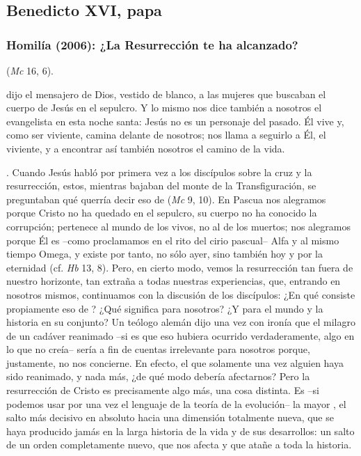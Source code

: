 \newsection
\subsection{Benedicto XVI, papa}

\subsubsection{Homilía (2006): ¿La Resurrección te ha alcanzado?}


\begin{body}
 (\textit{Mc} 16, 6). 

 dijo el mensajero de Dios, vestido de blanco, a las mujeres que buscaban el cuerpo de Jesús en el sepulcro. Y lo mismo nos dice también a nosotros el evangelista en esta noche santa: Jesús no es un personaje del pasado. Él vive y, como ser viviente, camina delante de nosotros; nos llama a seguirlo a Él, el viviente, y a encontrar así también nosotros el camino de la vida.

. Cuando Jesús habló por primera vez a los discípulos sobre la cruz y la resurrección, estos, mientras bajaban del monte de la Transfiguración, se preguntaban qué querría decir eso de  (\textit{Mc} 9, 10). En Pascua nos alegramos porque Cristo no ha quedado en el sepulcro, su cuerpo no ha conocido la corrupción; pertenece al mundo de los vivos, no al de los muertos; nos alegramos porque Él es –como proclamamos en el rito del cirio pascual– Alfa y al mismo tiempo Omega, y existe por tanto, no sólo ayer, sino también hoy y por la eternidad (cf. \textit{Hb} 13, 8). Pero, en cierto modo, vemos la resurrección tan fuera de nuestro horizonte, tan extraña a todas nuestras experiencias, que, entrando en nosotros mismos, continuamos con la discusión de los discípulos: ¿En qué consiste propiamente eso de ? ¿Qué significa para nosotros? ¿Y para el mundo y la historia en su conjunto? Un teólogo alemán dijo una vez con ironía que el milagro de un cadáver reanimado –si es que eso hubiera ocurrido verdaderamente, algo en lo que no creía– sería a fin de cuentas irrelevante para nosotros porque, justamente, no nos concierne. En efecto, el que solamente una vez alguien haya sido reanimado, y nada más, ¿de qué modo debería afectarnos? Pero la resurrección de Cristo es precisamente algo más, una cosa distinta. Es –si podemos usar por una vez el lenguaje de la teoría de la evolución– la mayor , el salto más decisivo en absoluto hacia una dimensión totalmente nueva, que se haya producido jamás en la larga historia de la vida y de sus desarrollos: un salto de un orden completamente nuevo, que nos afecta y que atañe a toda la historia.


\end{body}
